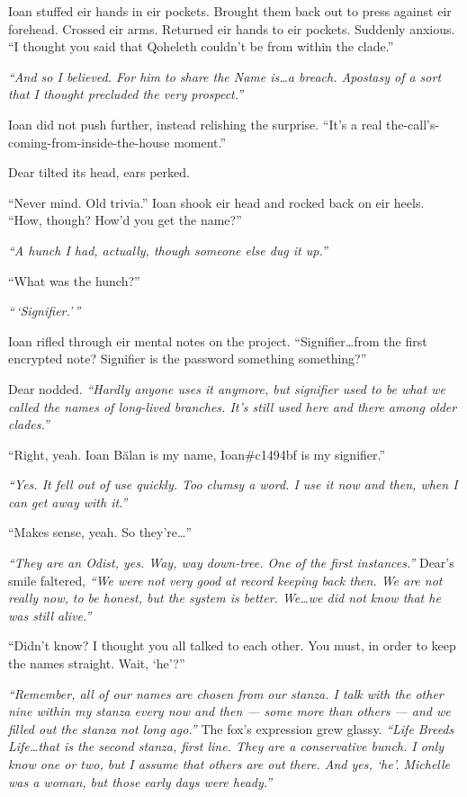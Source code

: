 Ioan stuffed eir hands in eir pockets. Brought them back out to press against eir forehead. Crossed eir arms. Returned eir hands to eir pockets. Suddenly anxious. ``I thought you said that Qoheleth couldn't be from within the clade.''

\emph{``And so I believed. For him to share the Name is\ldots{}a breach. Apostasy of a sort that I thought precluded the very prospect.''}

Ioan did not push further, instead relishing the surprise. ``It's a real the-call's-coming-from-inside-the-house moment.''

Dear tilted its head, ears perked.

``Never mind. Old trivia.'' Ioan shook eir head and rocked back on eir heels. ``How, though? How'd you get the name?''

\emph{``A hunch I had, actually, though someone else dug it up.''}

``What was the hunch?''

\emph{``\,`Signifier.'\,''}

Ioan rifled through eir mental notes on the project. ``Signifier\ldots{}from the first encrypted note? Signifier is the password something something?''

Dear nodded. \emph{``Hardly anyone uses it anymore, but signifier used to be what we called the names of long-lived branches. It's still used here and there among older clades.''}

``Right, yeah. Ioan Bălan is my name, Ioan\#c1494bf is my signifier.''

\emph{``Yes. It fell out of use quickly. Too clumsy a word. I use it now and then, when I can get away with it.''}

``Makes sense, yeah. So they're\ldots{}''

\emph{``They are an Odist, yes. Way, way down-tree. One of the first instances.''} Dear's smile faltered, \emph{``We were not very good at record keeping back then. We are not really now, to be honest, but the system is better. We\ldots{}we did not know that he was still alive.''}

``Didn't know? I thought you all talked to each other. You must, in order to keep the names straight. Wait, `he'?''

\emph{``Remember, all of our names are chosen from our stanza. I talk with the other nine within my stanza every now and then — some more than others — and we filled out the stanza not long ago.''} The fox's expression grew glassy. \emph{``Life Breeds Life\ldots{}that is the second stanza, first line. They are a conservative bunch. I only know one or two, but I assume that others are out there. And yes, `he'. Michelle was a woman, but those early days were heady.''}

